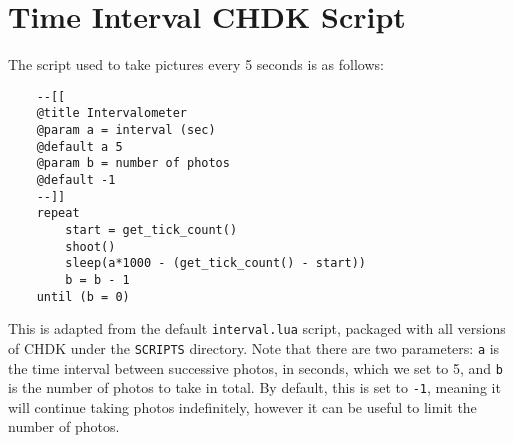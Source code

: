 \section{Time Interval CHDK Script}
\label{app:interval}

The script used to take pictures every 5 seconds is as follows:

\begin{verbatim}
    --[[
    @title Intervalometer
    @param a = interval (sec)
    @default a 5
    @param b = number of photos
    @default -1
    --]]
    repeat
        start = get_tick_count()
        shoot()
        sleep(a*1000 - (get_tick_count() - start))
        b = b - 1
    until (b = 0)
\end{verbatim}

This is adapted from the default \texttt{interval.lua} script, packaged with all
versions of CHDK under the \texttt{SCRIPTS} directory. Note that there are two
parameters: \texttt{a} is the time interval between successive photos, in
seconds, which we set to 5, and \texttt{b} is the number of photos to take in
total. By default, this is set to \texttt{-1}, meaning it will continue taking
photos indefinitely, however it can be useful to limit the number of photos.
